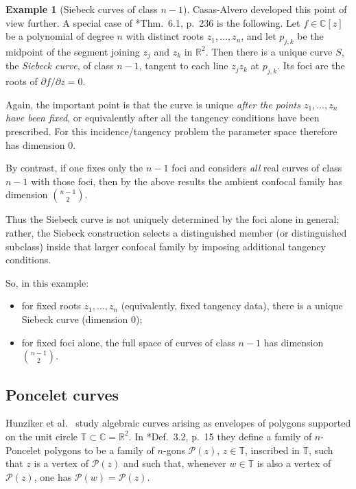 \documentclass[11pt]{amsart}
\theoremstyle{definition}
\newtheorem{example}[lemma]{Example}
\theoremstyle{remark}
\begin{document}
\begin{example}[Siebeck curves of class $n-1$]
Casas-Alvero \cite{CA1,CA2} developed this point of view further. A special case of
\cite{CA2}*{Thm.~6.1, p.~236} is the following. Let $f\in \mathbb C[z]$ be a polynomial
of degree $n$ with distinct roots $z_1,\dots,z_n$, and let $p_{j,k}$ be the midpoint of
the segment joining $z_j$ and $z_k$ in $\mathbb R^2$. Then there is a unique curve $S$,
the \emph{Siebeck curve}, of class $n-1$, tangent to each line $z_jz_k$ at $p_{j,k}$.
Its foci are the roots of $\partial f/\partial z=0$.

Again, the important point is that the curve is unique \emph{after the points
$z_1,\dots,z_n$ have been fixed}, or equivalently after all the tangency conditions have
been prescribed. For this incidence/tangency problem the parameter space therefore has
dimension $0$.

By contrast, if one fixes only the $n-1$ foci and considers \emph{all} real curves of
class $n-1$ with those foci, then by the above results the ambient confocal
family has dimension
$\binom{n-1}{2}.$ 

Thus the Siebeck curve is not uniquely determined by the foci alone in general; rather,
the Siebeck construction selects a distinguished member (or distinguished subclass) inside
that larger confocal family by imposing additional tangency conditions.

So, in this example:
\begin{itemize}
\item for fixed roots $z_1,\dots,z_n$ (equivalently, fixed tangency data), there is a unique Siebeck curve (dimension $0$);
\item for fixed foci alone, the full space of curves of class $n-1$ has dimension $\binom{n-1}{2}$.
\end{itemize}
\end{example}


\subsection{Poncelet curves}
Hunziker et al.\ \cite{Hunziker} study algebraic curves arising as envelopes of polygons
supported on the unit circle $\mathbb T\subset \mathbb C=\mathbb R^2$. In
\cite{Hunziker}*{Def.~3.2, p.~15} they define a family of $n$-Poncelet polygons to be a
family of $n$-gons $\mathcal P(z)$, $z\in\mathbb T$, inscribed in $\mathbb T$, such that
$z$ is a vertex of $\mathcal P(z)$ and such that, whenever $w\in\mathbb T$ is also a
vertex of $\mathcal P(z)$, one has $\mathcal P(w)=\mathcal P(z)$.
\end{document}

